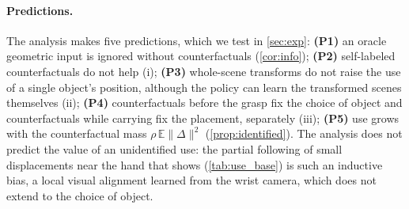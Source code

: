 \paragraph{Predictions.}
The analysis makes five predictions, which we test in \cref{sec:exp}:
\textbf{(P1)} an oracle geometric input is ignored without counterfactuals (\cref{cor:info});
\textbf{(P2)} self-labeled counterfactuals do not help (i);
\textbf{(P3)} whole-scene transforms do not raise the use of a single object's position, although the policy can learn
the transformed scenes themselves (ii);
\textbf{(P4)} counterfactuals before the grasp fix the choice of object and counterfactuals while carrying fix the
placement, separately (iii);
\textbf{(P5)} use grows with the counterfactual mass $\rho\,\mathbb{E}\lVert\Delta\rVert^2$ (\cref{prop:identified}).
The analysis does not predict the value of an unidentified use: the partial following of small displacements near the hand
that \pizf shows (\cref{tab:use_base}) is such an inductive bias, a local visual alignment learned from the wrist camera,
which does not extend to the choice of object.
